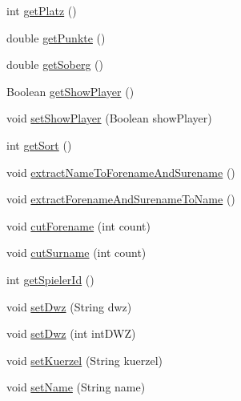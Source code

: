 \begin{DoxyCompactItemize}
\item 
int \hyperlink{classde_1_1turnierverwaltung_1_1model_1_1_player_a4cc955ea4ff230afb72a92b6c279592b}{get\+Platz} ()
\item 
double \hyperlink{classde_1_1turnierverwaltung_1_1model_1_1_player_aaa3e055a47b16b9d009b5562ca7bb021}{get\+Punkte} ()
\item 
double \hyperlink{classde_1_1turnierverwaltung_1_1model_1_1_player_ac604e2552fcba4c7b1bd4efb1bc007b4}{get\+Soberg} ()
\item 
Boolean \hyperlink{classde_1_1turnierverwaltung_1_1model_1_1_player_aeecd14d98c5b469144c9e0c54c4102dc}{get\+Show\+Player} ()
\item 
void \hyperlink{classde_1_1turnierverwaltung_1_1model_1_1_player_a89cf6d518ebf781c8e29728d05fbb643}{set\+Show\+Player} (Boolean show\+Player)
\item 
int \hyperlink{classde_1_1turnierverwaltung_1_1model_1_1_player_abbc9b055a0c8a6d0b262981a2d39ce83}{get\+Sort} ()
\item 
void \hyperlink{classde_1_1turnierverwaltung_1_1model_1_1_player_ac64fa65834425f733c885b5653f233ad}{extract\+Name\+To\+Forename\+And\+Surename} ()
\item 
void \hyperlink{classde_1_1turnierverwaltung_1_1model_1_1_player_a3be0b1724a472984fe7b952c14b1dfdc}{extract\+Forename\+And\+Surename\+To\+Name} ()
\item 
void \hyperlink{classde_1_1turnierverwaltung_1_1model_1_1_player_adc56a3aab9eb2c760f077af9883533c1}{cut\+Forename} (int count)
\item 
void \hyperlink{classde_1_1turnierverwaltung_1_1model_1_1_player_ac5c6896ef28b9e51c15135970f842402}{cut\+Surname} (int count)
\item 
int \hyperlink{classde_1_1turnierverwaltung_1_1model_1_1_player_aec156a5e3128765371b2a8f957bab9dd}{get\+Spieler\+Id} ()
\item 
void \hyperlink{classde_1_1turnierverwaltung_1_1model_1_1_player_ab23fc45cf7bf8832cf22d11838a943d9}{set\+Dwz} (String dwz)
\item 
void \hyperlink{classde_1_1turnierverwaltung_1_1model_1_1_player_aa8f077549e92a5ceacbdd6741b810b23}{set\+Dwz} (int int\+D\+WZ)
\item 
void \hyperlink{classde_1_1turnierverwaltung_1_1model_1_1_player_ad147cbd6391ced5e1b95b03fea0c7318}{set\+Kuerzel} (String kuerzel)
\item 
void \hyperlink{classde_1_1turnierverwaltung_1_1model_1_1_player_a11d6ac582db11089a6db04d1e271c9ef}{set\+Name} (String name)

\end{DoxyCompactItemize}
